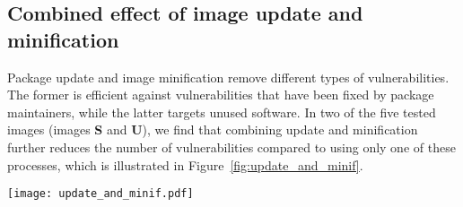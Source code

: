 \subsection{Combined effect of image update and  minification}

Package update and image minification remove different types of
vulnerabilities. The former is efficient against vulnerabilities that have
been fixed by package maintainers, while the latter targets unused
software. In two of the five tested images (images \textbf{S} and \textbf{U}), we find that combining update
and minification further reduces the number of vulnerabilities compared to
using only one of these processes, which is illustrated in
Figure~\ref{fig:update_and_minif}.

\begin{center}
\texttt{[image: update\_and\_minif.pdf]}
	\label{fig:update_and_minif}
\end{center}

